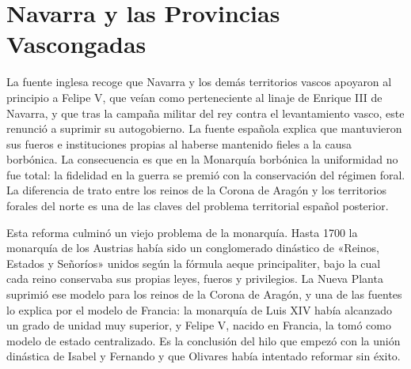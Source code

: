 \documentclass{book}
\begin{document}
\section{Navarra y las Provincias Vascongadas}

La fuente inglesa recoge que Navarra y los demás territorios vascos apoyaron al principio a Felipe V, que veían como perteneciente al linaje de Enrique III de Navarra, y que tras la campaña militar del rey contra el levantamiento vasco, este renunció a suprimir su autogobierno. La fuente española explica que mantuvieron sus fueros e instituciones propias al haberse mantenido fieles a la causa borbónica. La consecuencia es que en la Monarquía borbónica la uniformidad no fue total: la fidelidad en la guerra se premió con la conservación del régimen foral. La diferencia de trato entre los reinos de la Corona de Aragón y los territorios forales del norte es una de las claves del problema territorial español posterior.


Esta reforma culminó un viejo problema de la monarquía. Hasta 1700 la monarquía de los Austrias había sido un conglomerado dinástico de «Reinos, Estados y Señoríos» unidos según la fórmula aeque principaliter, bajo la cual cada reino conservaba sus propias leyes, fueros y privilegios. La Nueva Planta suprimió ese modelo para los reinos de la Corona de Aragón, y una de las fuentes lo explica por el modelo de Francia: la monarquía de Luis XIV había alcanzado un grado de unidad muy superior, y Felipe V, nacido en Francia, la tomó como modelo de estado centralizado. Es la conclusión del hilo que empezó con la unión dinástica de Isabel y Fernando y que Olivares había intentado reformar sin éxito.

\end{document}
